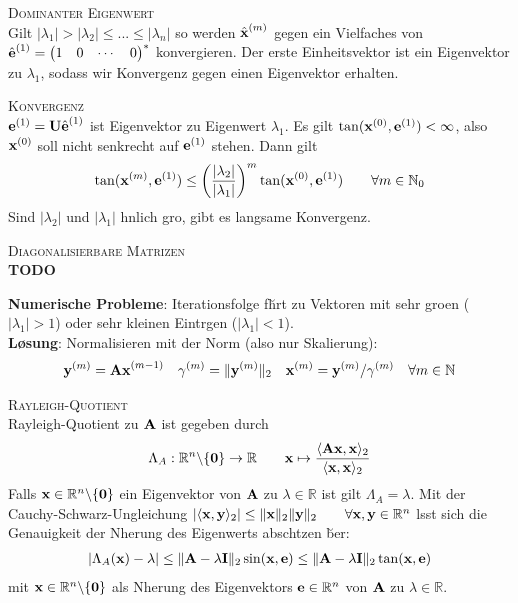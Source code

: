 \textsc{Dominanter Eigenwert}\\
Gilt $|\lambda_1| > |\lambda_2| \leq ... \leq |\lambda_n|$ so werden $\hat{\mbox{\bf x}}^{(m)}$ gegen ein Vielfaches von $\hat{\mbox{\bf e}}^{(1)} = \begin{pmatrix}
1 & 0 & \cdots & 0
\end{pmatrix}^*$
konvergieren. Der erste Einheitsvektor ist ein Eigenvektor zu $\lambda_1$, sodass wir Konvergenz gegen einen Eigenvektor erhalten. \vspace{0.2cm}

\textsc{Konvergenz}\\
$\mbox{\bf e}^{(1)} = \mbox{\bf U}\hat{\mbox{\bf e}}^{(1)}$ ist Eigenvektor zu Eigenwert $\lambda_1$. Es gilt $\tan(\mbox{\bf x}^{(0)}, \mbox{\bf e}^{(1)}) < \infty$, also $\mbox{\bf x}^{(0)}$ soll nicht senkrecht auf $\mbox{\bf e}^{(1)}$ stehen. Dann gilt 
\begin{align*}
\tan(\mbox{\bf x}^{(m)}, \mbox{\bf e}^{(1)}) \leq \left(\frac{|\lambda_2|}{|\lambda_1|}\right)^m \tan(\mbox{\bf x}^{(0)}, \mbox{\bf e}^{(1)}) \qquad \forall m \in \mathbb{N}_0
\end{align*}
Sind $|\lambda_2|$ und $|\lambda_1|$ \a hnlich gro\s  , gibt es langsame Konvergenz.

\textsc{Diagonalisierbare Matrizen}\\
\textbf{TODO}\vspace{0.2cm}


\textbf{Numerische Probleme}: Iterationsfolge f\u hrt zu Vektoren mit sehr gro\s en ($|\lambda_1|>1$) oder sehr kleinen Eintr\a gen ($|\lambda_1|<1$).\\
\textbf{L\o sung}: Normalisieren mit der Norm (also nur Skalierung):
\begin{align*}
\mbox{\bf y}^{(m)} = \mbox{\bf Ax}^{(m-1)} \quad \gamma^{(m)}= \Vert \mbox{\bf y}^{(m)} \Vert_2 \quad \mbox{\bf x}^{(m)} = \mbox{\bf y}^{(m)}/\gamma^{(m)} \quad \forall m\in \mathbb{N}
\end{align*}

\textsc{Rayleigh-Quotient}\\
Rayleigh-Quotient zu $\mbox{\bf A}$ ist gegeben durch
\begin{align*}
\Lambda_A: \mathbb{R}^{n} \backslash \{\mbox{\bf 0}\} \rightarrow \mathbb{R} \qquad \mbox{\bf x} \mapsto \frac{\langle \mbox{\bf Ax}, \mbox{\bf x} \rangle_2}{\langle \mbox{\bf x}, \mbox{\bf x} \rangle_2}
\end{align*}
Falls $\mbox{\bf x}\in \mathbb{R}^{n} \backslash \{\mbox{\bf 0}\}$ ein Eigenvektor von $\mbox{\bf A}$ zu $\lambda \in \mathbb{R}$ ist gilt $\Lambda_A = \lambda$. Mit der Cauchy-Schwarz-Ungleichung $|\langle \mbox{\bf x}, \mbox{\bf y} \rangle_2| \leq \Vert\mbox{\bf x} \Vert_2\Vert\mbox{\bf y} \Vert_2 \qquad \forall \mbox{\bf x},\mbox{\bf y} \in \mathbb{R}^{n}$ l\a sst sich die Genauigkeit der N\a herung des Eigenwerts absch\a tzen \u ber:
\begin{align*}
|\Lambda_A(\mbox{\bf x}) - \lambda| \leq \Vert \mbox{\bf A} - \lambda \mbox{\bf I} \Vert_2 \sin(\mbox{\bf x},\mbox{\bf e}) \leq \Vert \mbox{\bf A} -\lambda \mbox{\bf I} \Vert_2 \tan(\mbox{\bf x}, \mbox{\bf e})
\end{align*}
mit $\mbox{\bf x} \in \mathbb{R}^{n} \backslash \{\mbox{\bf 0}\}$ als N\a herung des Eigenvektors $\mbox{\bf e}\in \mathbb{R}^{n}$ von $\mbox{\bf A}$ zu $\lambda \in \mathbb{R}$.\\

